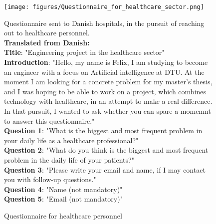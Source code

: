 \begin{figure}[H]
    \centering
    \texttt{[image: figures/Questionnaire\_for\_healthcare\_sector.png]}
    \caption{Questionnaire for healthcare personnel}
    \medskip
    \small
    \raggedright
    Questionnaire sent to Danish hospitals, in the pursuit of reaching out to healthcare personnel.
    \\
    \textbf{Translated from Danish:}
    \\
    \textbf{Title}: "Engineering project in the healthcare sector"
    \\
    \textbf{Introduction}: "Hello, my name is Felix, I am studying to become an engineer with a focus on Artificial intelligence at DTU. At the moment I am looking for a concrete problem for my master's thesis, and I was hoping to be able to work on a project, which combines technology with healthcare, in an attempt to make a real difference. In that pursuit, I wanted to ask whether you can spare a momemnt to answer this questionnaire." 
    \\
    \textbf{Question 1}: "What is the biggest and most frequent problem in your daily life as a healthcare professional?"
    \\
    \textbf{Question 2}: "What do you think is the biggest and most frequent problem in the daily life of your patients?"
    \\
    \textbf{Question 3}: "Please write your email and name, if I may contact you with follow-up questions."
    \\
    \textbf{Question 4}: "Name (not mandatory)"
    \\
    \textbf{Question 5}: "Email (not mandatory)"
    \label{fig:questionnaire_healthcare_personnel}
\end{figure}